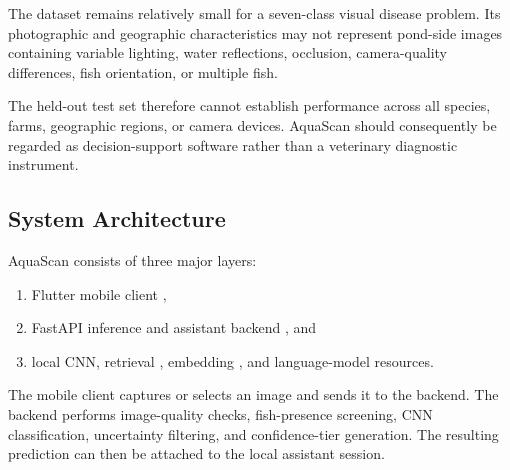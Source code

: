 \documentclass[conference]{IEEEtran}
\begin{document}
The dataset \cite{b2} remains relatively small for a seven-class visual disease problem. Its photographic and geographic characteristics may not represent pond-side images containing variable lighting, water reflections, occlusion, camera-quality differences, fish orientation, or multiple fish.

The held-out test set therefore cannot establish performance across all species, farms, geographic regions, or camera devices. AquaScan should consequently be regarded as decision-support software rather than a veterinary diagnostic instrument.

\subsection{System Architecture}

AquaScan consists of three major layers:

\begin{enumerate}
    \item Flutter mobile client \cite{b14},
    \item FastAPI inference and assistant backend \cite{b15}, and
    \item local CNN, retrieval \cite{b6}, embedding \cite{b5}, and language-model \cite{b13} resources.
\end{enumerate}

The mobile client captures or selects an image and sends it to the backend. The backend performs image-quality checks, fish-presence screening, CNN classification, uncertainty filtering, and confidence-tier generation. The resulting prediction can then be attached to the local assistant session.
\end{document}
